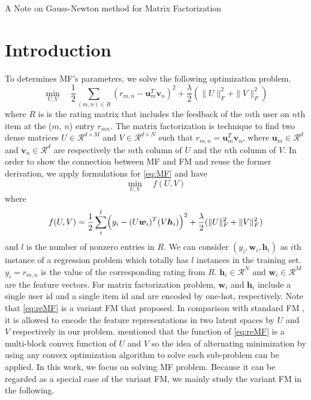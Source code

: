 \documentclass[11pt,twoside]{article}
\newcommand{\bsym}[1]{\ensuremath{\boldsymbol{#1}}}
\newcommand{\bw}{\ensuremath{\bsym{w}}}
\newcommand{\bh}{\ensuremath{\bsym{h}}}
\newcommand{\bu}{\ensuremath{\bsym{u}}}
\newcommand{\bv}{\ensuremath{\bsym{v}}}
\newcommand{\bbr}{\ensuremath{\mathcal R}}
\begin{document}
\begin{center}
    {\Large A Note on Gauss-Newton method for Matrix Factorization}
\end{center}


\section{Introduction}
To determines MF's parameters, we solve the following optimization problem.
\begin{equation}
    \min_{U,V} \quad \frac{1}{2}\sum_{(m, n) \in R}  (r_{m,n} - \bu_m^T \bv_n)^2+
    \frac{\lambda}{2} (\|U\|^2_F + \|V\|^2_F	)
    \label{eq:MF}
\end{equation}
where
$R$ is is the rating matrix that includes the feedback of the $m$th user on $n$th item at the ($m$, $n$) entry $r_{m n}$. The matrix factorization is technique to find two dense matrices $U \in \bbr^{d \times M}$ and $V \in \bbr^{d \times N}$ such that $r_{m,n} = \bu_m^T\bv_n$, where $\bu_m \in \bbr^d$ and $\bv_n \in \bbr^d$ are respectively the $m$th column of $U$ and the $n$th column of $V$.  In order to show the connection between MF and FM and reuse the former derivation, we apply formulations for \eqref{eq:MF} and have
\begin{equation}
\min_{U, V} \quad f(U, V)\label{eq:min_reMF}
\end{equation}
where 
\begin{equation}
    f(U, V) = \frac{1}{2}\sum_{i}^l  \Bigl(y_i - (U \bw_i)^T (V \bh_i)\Bigr)^2+
    \frac{\lambda}{2} (\|U\|^2_F +\|V\|^2_F	)
    \label{eq:reMF}
\end{equation}
and $l$ is the number of nonzero entries in $R$. We can consider $(y_i, \bw_i, \bh_i)$ as $i$th instance of a regression problem which totally has $l$ instances in the training set.
$y_i=r_{m, n}$ is the value of the corresponding rating from $R$. $\bh_i \in \bbr^N $ and $\bw_i \in \bbr^M$ are the feature vectors. For matrix factorization problem, $\bw_i$ and $\bh_i$  include a single user id and a single item id and are encoded by one-hot, respectively.  
Note that \eqref{eq:reMF} is a variant FM that \citet{MB16a} proposed. 
In comparison with standard FM \citep{SR10c}, 
it is allowed to encode the feature representations in two latent spaces by $U$ and $V$ respectively in our problem. 
\citet{MB16a} mentioned that the function of \eqref{eq:reMF} is a multi-block convex function of $U$ and $V$ so the idea of alternating minimization by using any convex optimization algorithm to solve each sub-problem can be applied. In this work, we focus on solving MF problem. Because it can be regarded as a special case of the variant FM, we mainly study the variant FM in the following.
\end{document}
